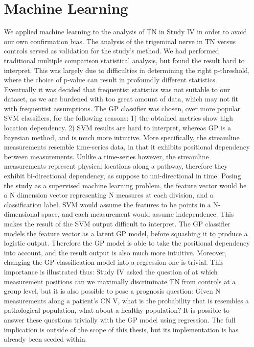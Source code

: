 \section{Machine Learning}

We applied machine learning to the analysis of TN in Study IV in order to avoid our own confirmation bias. The analysis of the trigeminal nerve in TN versus controls served as validation for the study's method. We had performed traditional multiple comparison statistical analysis, but found the result hard to interpret. This was largely due to difficulties in determining the right p-threshold, where the choice of p-value can result in profoundly different statistics. Eventually it was decided that frequentist statistics was not suitable to our dataset, as we are burdened with too great amount of data, which may not fit with frequentist assumptions. 
The GP classifier was chosen, over more popular SVM classifiers, for the following reasons: 1) the obtained metrics show high location dependency. 2) SVM results are hard to interpret, whereas GP is a bayesian method, and is much more intuitive. More specifically, the streamline measurements resemble time-series data, in that it exhibits positional dependency between measurements. Unlike a time-series however, the streamline measurements represent physical locations along a pathway, therefore they exhibit bi-directional dependency, as suppose to uni-directional in time. Posing the study as a supervised machine learning problem, the feature vector would be a N dimension vector representing N measures at each division, and a classification label. SVM would assume the features to be points in a N-dimensional space, and each measurement would assume independence. This makes the result of the SVM output difficult to interpret. The GP classifier models the feature vector as a latent GP model, before squashing it to produce a logistic output. Therefore the GP model is able to take the positional dependency into account, and the result output is also much more intuitive. 
Moreover, changing the GP classification model into a regression one is trivial. This importance is illustrated thus: Study IV asked the question of at which measurement positions can we maximally discriminate TN from controls at a group level, but it is also possible to pose a prognosis question: Given N measurements along a patient's CN V, what is the probability that is resembles a pathological population, what about a healthy population? It is possible to answer these questions trivially with the GP model using regression. The full implication is outside of the scope of this thesis, but its implementation is has already been seeded within. 


